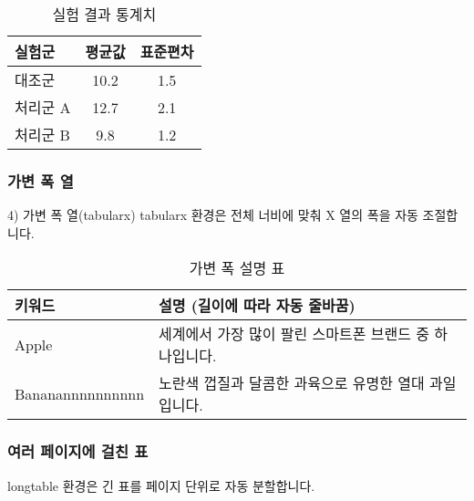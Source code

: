 \begin{table}[ht]
  \centering
  \begin{tabular}{lcc}
    \toprule
    실험군   & 평균값 & 표준편차 \\ \midrule
    대조군   & 10.2   & 1.5      \\
    처리군 A & 12.7   & 2.1      \\
    처리군 B & 9.8    & 1.2      \\ \bottomrule
  \end{tabular}
  \caption{실험 결과 통계치} \label{tab:stats}
\end{table}


\subsubsection{가변 폭 열}
4) 가변 폭 열(tabularx)
tabularx 환경은 전체 너비에 맞춰 X 열의 폭을 자동 조절합니다.

\begin{table}[ht]
  \centering
  \begin{tabularx}{\textwidth}{lX}
    \toprule
    키워드 & 설명 (길이에 따라 자동 줄바꿈) \\ \midrule
    Apple  & 세계에서 가장 많이 팔린 스마트폰 브랜드 중 하나입니다. \\
    Bananannnnnnnnnn & 노란색 껍질과 달콤한 과육으로 유명한 열대 과일입니다. \\ \bottomrule
  \end{tabularx}
  \caption{가변 폭 설명 표}
  \label{tab:tabularx}
\end{table}

\subsubsection{여러 페이지에 걸친 표}
longtable 환경은 긴 표를 페이지 단위로 자동 분할합니다.

